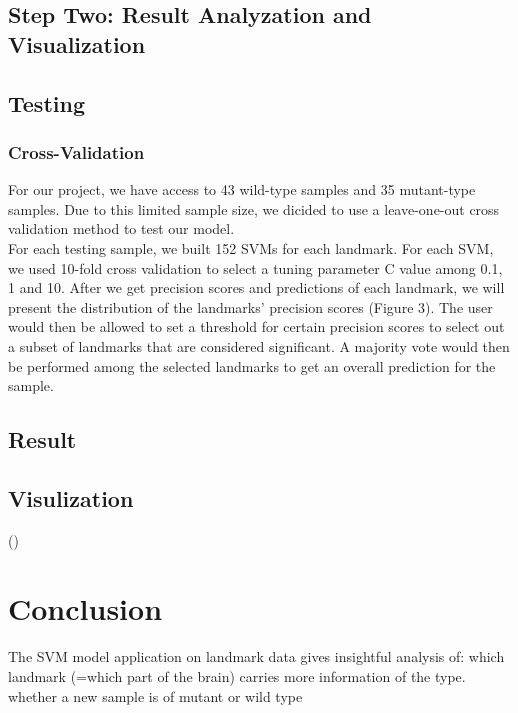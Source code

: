 \documentclass[10pt,letterpaper]{article}
\begin{document}
\subsection{Step Two: Result Analyzation and
Visualization}\label{step-two-result-analyzation-and-visualization}

\subsection{Testing}\label{testing}

\subsubsection{Cross-Validation}\label{cross-validation}

For our project, we have access to 43 wild-type samples and 35
mutant-type samples. Due to this limited sample size, we dicided to use
a leave-one-out cross validation method to test our model.\\
For each testing sample, we built 152 SVMs for each landmark. For each
SVM, we used 10-fold cross validation to select a tuning parameter C
value among 0.1, 1 and 10. After we get precision scores and predictions
of each landmark, we will present the distribution of the landmarks'
precision scores (Figure 3). The user would then be allowed to set a
threshold for certain precision scores to select out a subset of
landmarks that are considered significant. A majority vote would then be
performed among the selected landmarks to get an overall prediction for
the sample.

\subsection{Result}\label{result}

\subsection{Visulization}\label{visulization}

()

\section{Conclusion}\label{conclusion}

The SVM model application on landmark data gives insightful analysis of:
which landmark (=which part of the brain) carries more information of
the type. whether a new sample is of mutant or wild type
\end{document}
